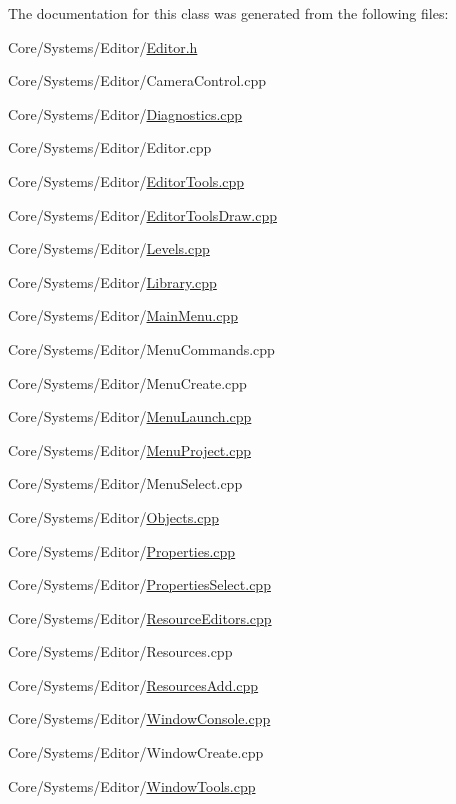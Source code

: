 The documentation for this class was generated from the following files\-:\begin{DoxyCompactItemize}
\item 
Core/\-Systems/\-Editor/\hyperlink{Editor_8h}{Editor.\-h}\item 
Core/\-Systems/\-Editor/Camera\-Control.\-cpp\item 
Core/\-Systems/\-Editor/\hyperlink{Diagnostics_8cpp}{Diagnostics.\-cpp}\item 
Core/\-Systems/\-Editor/Editor.\-cpp\item 
Core/\-Systems/\-Editor/\hyperlink{EditorTools_8cpp}{Editor\-Tools.\-cpp}\item 
Core/\-Systems/\-Editor/\hyperlink{EditorToolsDraw_8cpp}{Editor\-Tools\-Draw.\-cpp}\item 
Core/\-Systems/\-Editor/\hyperlink{Levels_8cpp}{Levels.\-cpp}\item 
Core/\-Systems/\-Editor/\hyperlink{Library_8cpp}{Library.\-cpp}\item 
Core/\-Systems/\-Editor/\hyperlink{MainMenu_8cpp}{Main\-Menu.\-cpp}\item 
Core/\-Systems/\-Editor/Menu\-Commands.\-cpp\item 
Core/\-Systems/\-Editor/Menu\-Create.\-cpp\item 
Core/\-Systems/\-Editor/\hyperlink{MenuLaunch_8cpp}{Menu\-Launch.\-cpp}\item 
Core/\-Systems/\-Editor/\hyperlink{MenuProject_8cpp}{Menu\-Project.\-cpp}\item 
Core/\-Systems/\-Editor/Menu\-Select.\-cpp\item 
Core/\-Systems/\-Editor/\hyperlink{Objects_8cpp}{Objects.\-cpp}\item 
Core/\-Systems/\-Editor/\hyperlink{Properties_8cpp}{Properties.\-cpp}\item 
Core/\-Systems/\-Editor/\hyperlink{PropertiesSelect_8cpp}{Properties\-Select.\-cpp}\item 
Core/\-Systems/\-Editor/\hyperlink{ResourceEditors_8cpp}{Resource\-Editors.\-cpp}\item 
Core/\-Systems/\-Editor/Resources.\-cpp\item 
Core/\-Systems/\-Editor/\hyperlink{ResourcesAdd_8cpp}{Resources\-Add.\-cpp}\item 
Core/\-Systems/\-Editor/\hyperlink{WindowConsole_8cpp}{Window\-Console.\-cpp}\item 
Core/\-Systems/\-Editor/Window\-Create.\-cpp\item 
Core/\-Systems/\-Editor/\hyperlink{WindowTools_8cpp}{Window\-Tools.\-cpp}\end{DoxyCompactItemize}
